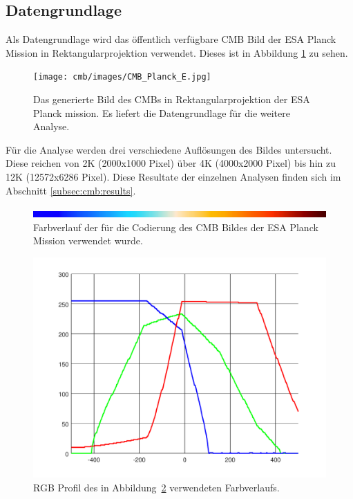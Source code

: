 \subsection{Datengrundlage}
Als Datengrundlage wird das öffentlich verfügbare CMB Bild der ESA Planck 
Mission in Rektangularprojektion \cite{cmb_public_equirectangular} 
verwendet. Dieses ist in Abbildung \ref{fig:cmb-rectangular} zu sehen.

\begin{figure}
	\centering
	\texttt{[image: cmb/images/CMB\_Planck\_E.jpg]}
	\caption{Das generierte Bild des CMBs in Rektangularprojektion der ESA 
		Planck mission. Es liefert die Datengrundlage für die weitere Analyse.}
	\label{fig:cmb-rectangular}
\end{figure}

Für die Analyse werden drei verschiedene Auflösungen des Bildes untersucht. 
Diese reichen von 2K (2000x1000 Pixel) über 4K (4000x2000 Pixel) bis hin zu 12K 
(12572x6286 Pixel). Diese Resultate der einzelnen Analysen finden sich im 
Abschnitt \ref{subsec:cmb:results}.



\begin{figure}
	\centering
	\includegraphics[width=\linewidth]{cmb/images/color-strip-full.png}
	\caption{Farbverlauf der für die Codierung des CMB Bildes der ESA Planck 
		Mission verwendet wurde.}
	\label{fig:color-strip-orig}
\end{figure}

\begin{figure}
	\centering
	\includegraphics[width=\linewidth]{cmb/converter/rgb-graph.pdf}
	\caption{RGB Profil des in Abbildung~\ref{fig:color-strip-orig} 
		verwendeten Farbverlaufs.}
	\label{fig:color-strip-orig-rgb}
\end{figure}

